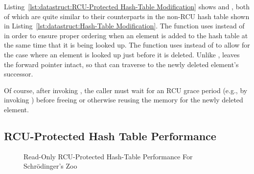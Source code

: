 Listing~\ref{lst:datastruct:RCU-Protected Hash-Table Modification}
shows  and , both of which
are quite similar to their counterparts in the non-RCU hash table
shown in
Listing~\ref{lst:datastruct:Hash-Table Modification}.
The  function uses  instead
of  in order to ensure proper ordering when
an element is added to the hash table at the same time that it is
being looked up.
The  function uses  instead
of  to allow for the case where an element is
looked up just before it is deleted.
Unlike ,  leaves the
forward pointer intact, so that  can traverse
to the newly deleted element's successor.

Of course, after invoking , the caller must wait for
an RCU grace period (e.g., by invoking ) before
freeing or otherwise reusing the memory for the newly deleted element.

\subsection{RCU-Protected Hash Table Performance}
\label{sec:datastruct:RCU-Protected Hash Table Performance}

\begin{figure}[tb]
\centering
{}
\caption{Read-Only RCU-Protected Hash-Table Performance For Schr\"odinger's Zoo}
\label{fig:datastruct:Read-Only RCU-Protected Hash-Table Performance For Schroedinger's Zoo}
\end{figure}

